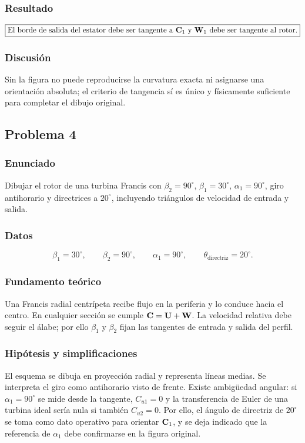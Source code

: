 \documentclass[12pt]{article}
\newcommand{\resultado}[1]{\[
  \boxed{\displaystyle #1}
\]}
\begin{document}
\subsubsection*{Resultado}
\resultado{\text{El borde de salida del estator debe ser tangente a }\vb C_1
\text{ y }\vb W_1\text{ debe ser tangente al rotor.}}

\subsubsection*{Discusión}
Sin la figura no puede reproducirse la curvatura exacta ni asignarse una orientación absoluta;
el criterio de tangencia sí es único y físicamente suficiente para completar el dibujo original.

\subsection{Problema 4}

\subsubsection*{Enunciado}
Dibujar el rotor de una turbina Francis con $\beta_2=90^\circ$, $\beta_1=30^\circ$,
$\alpha_1=90^\circ$, giro antihorario y directrices a $20^\circ$, incluyendo triángulos de
velocidad de entrada y salida.

\subsubsection*{Datos}
\[
\beta_1=30^\circ,\qquad \beta_2=90^\circ,\qquad \alpha_1=90^\circ,
\qquad \theta_{\mathrm{directriz}}=20^\circ.
\]

\subsubsection*{Fundamento teórico}
Una Francis radial centrípeta recibe flujo en la periferia y lo conduce hacia el centro. En
cualquier sección se cumple $\vb C=\vb U+\vb W$. La velocidad relativa debe seguir el álabe;
por ello $\beta_1$ y $\beta_2$ fijan las tangentes de entrada y salida del perfil.

\subsubsection*{Hipótesis y simplificaciones}
El esquema se dibuja en proyección radial y representa líneas medias. Se interpreta el giro
como antihorario visto de frente. Existe ambigüedad angular: si $\alpha_1=90^\circ$ se mide
desde la tangente, $C_{u1}=0$ y la transferencia de Euler de una turbina ideal sería nula si
también $C_{u2}=0$. Por ello, el ángulo de directriz de $20^\circ$ se toma como dato operativo
para orientar $\vb C_1$, y se deja indicado que la referencia de $\alpha_1$ debe confirmarse
en la figura original.
\end{document}
